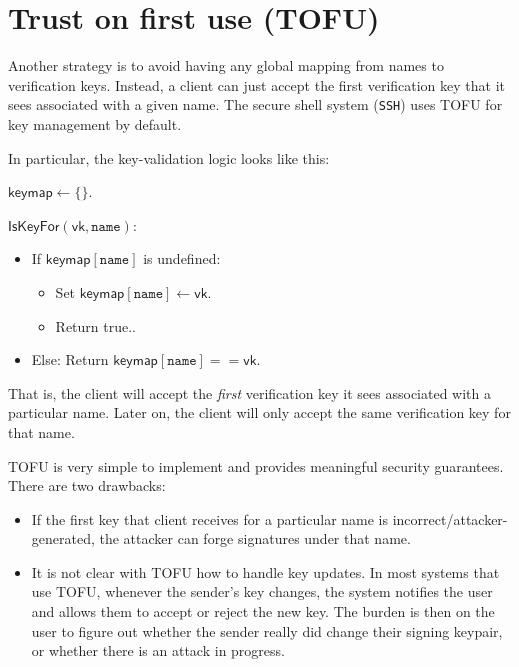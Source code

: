 \documentclass[
  letterpaper,
]{scrbook}
\providecommand{\tightlist}{%
  \setlength{\itemsep}{0pt}\setlength{\parskip}{0pt}}
\newcommand{\vk}{\mathsf{vk}}
\theoremstyle{definition}
\theoremstyle{plain}
\theoremstyle{plain}
\theoremstyle{remark}
\begin{document}
\section{Trust on first use (TOFU)}\label{trust-on-first-use-tofu}

Another strategy is to avoid having any global mapping from names to
verification keys. Instead, a client can just accept the first
verification key that it sees associated with a given name. The secure
shell system (\texttt{SSH}) uses TOFU for key management by default.

In particular, the key-validation logic looks like this:

\begin{tcolorbox}[enhanced jigsaw, arc=.35mm, bottomrule=.15mm, breakable, colback=white, colframe=quarto-callout-note-color-frame, left=2mm, leftrule=.75mm, opacityback=0, rightrule=.15mm, toprule=.15mm]

\(\mathsf{keymap} \gets \{ \}\).

\(\mathsf{IsKeyFor}(\vk, \mathtt{name}):\)

\begin{itemize}
\tightlist
\item
  If \(\mathsf{keymap}[\mathtt{name}]\) is undefined:

  \begin{itemize}
  \tightlist
  \item
    Set \(\mathsf{keymap}[\mathtt{name}] \gets \vk\).
  \item
    Return true..
  \end{itemize}
\item
  Else: Return \(\mathsf{keymap}[\mathtt{name}] == \vk\).
\end{itemize}

\end{tcolorbox}

That is, the client will accept the \emph{first} verification key it
sees associated with a particular name. Later on, the client will only
accept the same verification key for that name.

TOFU is very simple to implement and provides meaningful security
guarantees. There are two drawbacks:

\begin{itemize}
\tightlist
\item
  If the first key that client receives for a particular name is
  incorrect/attacker-generated, the attacker can forge signatures under
  that name.
\item
  It is not clear with TOFU how to handle key updates. In most systems
  that use TOFU, whenever the sender's key changes, the system notifies
  the user and allows them to accept or reject the new key. The burden
  is then on the user to figure out whether the sender really did change
  their signing keypair, or whether there is an attack in progress.
\end{itemize}
\end{document}
